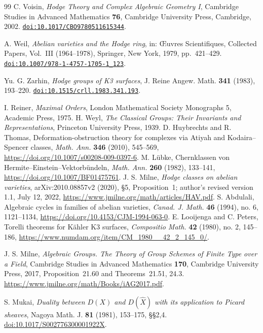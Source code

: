 \documentclass[11pt,reqno]{amsart}
\numberwithin{equation}{section}
\theoremstyle{plain}
\theoremstyle{definition}
\begin{document}
\begin{thebibliography}{99}
C. Voisin,
\emph{Hodge Theory and Complex Algebraic Geometry I},
Cambridge Studies in Advanced Mathematics \textbf{76},
Cambridge University Press, Cambridge, 2002.
\href{https://doi.org/10.1017/CBO9780511615344}{\nolinkurl{doi:10.1017/CBO9780511615344}}.

A. Weil,
\emph{Abelian varieties and the Hodge ring},
in: \OE uvres Scientifiques, Collected Papers, Vol.~III (1964--1978),
Springer, New York, 1979, pp.~421--429.
\href{https://doi.org/10.1007/978-1-4757-1705-1_123}{\nolinkurl{doi:10.1007/978-1-4757-1705-1_123}}.

Yu. G. Zarhin,
\emph{Hodge groups of K3 surfaces},
J. Reine Angew. Math. \textbf{341} (1983), 193--220.
\href{https://doi.org/10.1515/crll.1983.341.193}{\nolinkurl{doi:10.1515/crll.1983.341.193}}.


 I. Reiner, \emph{Maximal Orders}, London Mathematical Society Monographs 5, Academic Press, 1975.
 H. Weyl, \emph{The Classical Groups: Their Invariants and Representations}, Princeton University Press, 1939.
 D. Huybrechts and R. Thomas, Deformation-obstruction theory for complexes via Atiyah and Kodaira--Spencer classes, \emph{Math. Ann.} \textbf{346} (2010), 545--569, \url{https://doi.org/10.1007/s00208-009-0397-6}.
 M. L\"ubke, Chernklassen von Hermite--Einstein--Vektorb\"undeln, \emph{Math. Ann.} \textbf{260} (1982), 133--141, \url{https://doi.org/10.1007/BF01475761}.
 J. S. Milne, \emph{Hodge classes on abelian varieties}, arXiv:2010.08857v2 (2020), \S5, Proposition~1; author's revised version 1.1, July 12, 2022, \url{https://www.jmilne.org/math/articles/HAV.pdf}.
 S. Abdulali, Algebraic cycles in families of abelian varieties, \emph{Canad. J. Math.} \textbf{46} (1994), no. 6, 1121--1134, \url{https://doi.org/10.4153/CJM-1994-063-0}.
 E. Looijenga and C. Peters, Torelli theorems for K\"ahler K3 surfaces, \emph{Compositio Math.} \textbf{42} (1980), no. 2, 145--186, \url{https://www.numdam.org/item/CM_1980__42_2_145_0/}.

J. S. Milne, \emph{Algebraic Groups. The Theory of Group
Schemes of Finite Type over a Field}, Cambridge Studies in
Advanced Mathematics \textbf{170}, Cambridge University
Press, 2017, Proposition~21.60 and Theorems~21.51, 24.3.
\url{https://www.jmilne.org/math/Books/iAG2017.pdf}.

S. Mukai, \emph{Duality between $D(X)$ and $D(\widehat X)$
with its application to Picard sheaves}, Nagoya Math. J.
\textbf{81} (1981), 153--175, \S\S2,4.
\href{https://doi.org/10.1017/S002776300001922X}{doi:10.1017/S002776300001922X}.


\end{thebibliography}
\end{document}
